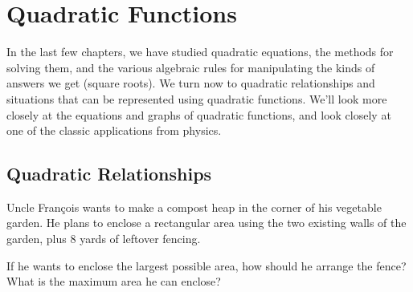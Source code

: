 \chapter{Quadratic Functions}
\label{ch:quadfunc}


In the last few chapters, we have studied quadratic equations, the methods for solving them, and the various algebraic rules for manipulating the kinds of answers we get (square roots). We turn now to quadratic relationships and situations that can be represented using quadratic functions. We'll look more closely at the equations and graphs of quadratic functions, and look closely at one of the classic applications from physics.

\section{Quadratic Relationships}
\label{sec:quadrelationships}


\begin{boxexplore}
Uncle Fran\c{c}ois wants to make a compost heap in the corner of his vegetable garden. He plans to enclose a rectangular area using the two existing walls of the garden, plus 8 yards of leftover fencing.

\begin{center}
\end{center}

If he wants to enclose the largest possible area, how should he arrange the fence? What is the maximum area he can enclose?
\end{boxexplore}

